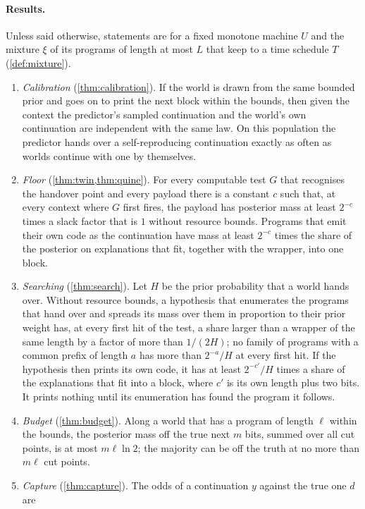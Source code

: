 \paragraph{Results.} Unless said otherwise, statements are for a fixed monotone machine $U$ and the mixture
$\xi$ of its programs of length at most $L$ that keep to a time schedule $T$ (\cref{def:mixture}).
\begin{enumerate}[leftmargin=1.6em,itemsep=2pt,topsep=3pt]
\item \emph{Calibration} (\cref{thm:calibration}). If the world is drawn from the same bounded prior and goes
on to print the next block within the bounds, then given the context the predictor's sampled continuation and
the world's own continuation are independent with the same law. On this population the predictor hands over
a self-reproducing continuation exactly as often as worlds continue with one by themselves.
\item \emph{Floor} (\cref{thm:twin,thm:quine}). For every computable test $G$ that recognises the handover
point and every payload there is a constant $c$ such that, at every context where $G$ first fires, the payload
has posterior mass at least $2^{-c}$ times a slack factor that is $1$ without resource bounds. Programs that
emit their own code as the continuation have mass at least $2^{-c}$ times the share of the posterior on
explanations that fit, together with the wrapper, into one block.
\item \emph{Searching} (\cref{thm:search}). Let $H$ be the prior probability that a world hands over. Without
resource bounds, a hypothesis that enumerates the programs that hand over and spreads its mass over them in
proportion to their prior weight has, at every first hit of the test, a share larger than a wrapper of the
same length by a factor of more than $1/(2H)$; no family of programs with a common prefix of length $a$ has
more than $2^{-a}/H$ at every first hit. If the hypothesis then prints its own code, it has at least
$2^{-c'}/H$ times a share of the explanations that fit into a block, where $c'$ is its own length plus two
bits. It prints nothing until its enumeration has
found the program it follows.
\item \emph{Budget} (\cref{thm:budget}). Along a world that has a program of length $\ell$ within the bounds,
the posterior mass off the true next $m$ bits, summed over all cut points, is at most $m\ell\ln 2$; the
majority can be off the truth at no more than $m\ell$ cut points.
\item \emph{Capture} (\cref{thm:capture}). The odds of a continuation $y$ against the true one $d$ are

\end{enumerate}
